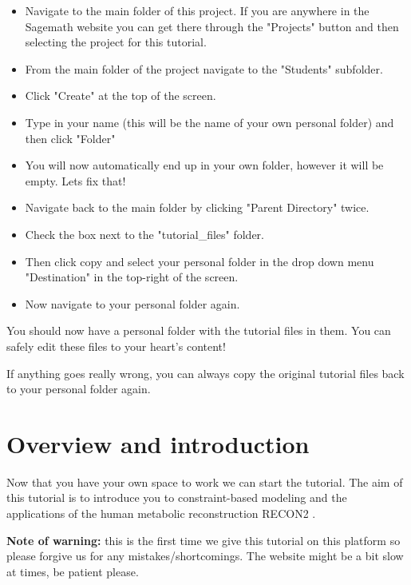 \documentclass{article}
\begin{document}
\begin{tcolorbox}[width=\textwidth,colback={yellow},title={ASSIGNMENT},coltitle=white]

\begin{itemize}
\item Navigate to the main folder of this project. If you are anywhere in the Sagemath website you can get there through the "Projects" button and then selecting the project for this tutorial.
\item From the main folder of the project navigate to the "Students" subfolder.
\item Click "Create" at the top of the screen.
\item Type in your name (this will be the name of your own personal folder) and then click "Folder"
\item You will now automatically end up in your own folder, however it will be empty. Lets fix that!
\item Navigate back to the main folder by clicking "Parent Directory" twice.
\item Check the box next to the "tutorial\_files" folder.
\item Then click copy and select your personal folder in the drop down menu "Destination" in the top-right of the screen.
\item Now navigate to your personal folder again. 
\end{itemize}
\end{tcolorbox}

You should now have a personal folder with the tutorial files in them. You can safely edit these files to your heart's content!

If anything goes really wrong, you can always copy the original tutorial files back to your personal folder again.

\section*{Overview and introduction}

Now that you have your own space to work we can start the tutorial. The aim of this tutorial is to introduce you to constraint-based modeling and the applications of the human metabolic reconstruction RECON2 \cite{Thiele2013}. 

\textbf{Note of warning:} this is the first time we give this tutorial on this platform so please forgive us for any mistakes/shortcomings. The website might be a bit slow at times, be patient please.
\end{document}
